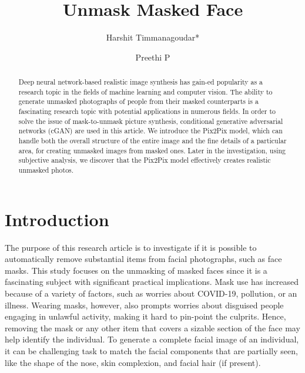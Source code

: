 \documentclass{./styles/svproc}
\begin{document}
\mainmatter 

\title{Unmask Masked Face}

\author{Harshit Timmanagoudar{*} \and Preethi P}

\maketitle 

\begin{abstract}
Deep neural network-based realistic image synthesis has gain-ed popularity as a research topic in the fields of machine learning and computer vision. The ability to generate unmasked photographs of people from their masked counterparts is a fascinating research topic with potential applications in numerous fields. In order to solve the issue of mask-to-unmask picture synthesis, conditional generative adversarial networks (cGAN) are used in this article. We introduce the Pix2Pix model, which can handle both the overall structure of the entire image and the fine details of a particular area, for creating unmasked images from masked ones. Later in the investigation, using subjective analysis, we discover that the Pix2Pix model effectively creates realistic unmasked photos.
\end{abstract}

\section{Introduction}
The purpose of this research article is to investigate if it is possible to automatically remove substantial items from facial photographs, such as face masks. This study focuses on the unmasking of masked faces since it is a fascinating subject with significant practical implications. Mask use has increased because of a variety of factors, such as worries about COVID-19, pollution, or an illness. Wearing masks, however, also prompts worries about disguised people engaging in unlawful activity, making it hard to pin-point the culprits. Hence, removing the mask or any other item that covers a sizable section of the face may help identify the individual. To generate a complete facial image of an individual, it can be challenging task to match the facial components that are partially seen, like the shape of the nose, skin complexion, and facial hair (if present).
\end{document}
